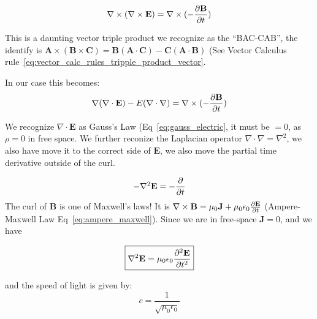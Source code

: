 \begin{equation}
    \nabla\times(\nabla \times \mathbf{E}) = \nabla\times( -\pdv{\mathbf B}{t}) 
\end{equation}

This is a daunting vector triple product we recognize as the  ``BAC-CAB'', the identify is $\mathbf{A}\times(\mathbf{B}\times\mathbf{C})
= \mathbf{B}(\mathbf{A}\cdot\mathbf{C}) - \mathbf{C}(\mathbf{A}\cdot\mathbf{B})$
(See Vector Calculus rule~\eqref{eq:vector_calc_rules_tripple_product_vector}.

In our case this becomes:
\begin{equation}
    \nabla(\nabla\cdot \mathbf E) - E(\nabla \cdot \nabla) = \nabla\times( -\pdv{\mathbf B}{t}) 
\end{equation}

We recognize $\nabla\cdot \mathbf E$ as Gauss's Law (Eq~\ref{eq:gauss_electric}, it must be $=0$, as $\rho=0$ in free space. We  further reconize the Laplacian operator $\nabla \cdot \nabla = \nabla^2$, we also have move it to the correct side of $\mathbf E$, we also move the partial time derivative outside of the curl. 

\begin{equation}
    -\nabla^2 \mathbf{E} = -\pdv{}{t}(\nabla \times \mathbf{B})
\end{equation}
The curl of $\mathbf{B}$ is one of Maxwell's laws! It is $\nabla\times\mathbf B = \mu_0\mathbf J
+ \mu_0\epsilon_0\pdv{\mathbf E}{t}$ (Ampere-Maxwell Law Eq~\ref{eq:ampere_maxwell}). Since we are in free-space $\mathbf J=0$, and we have 

\begin{equation}
    \boxed{\nabla^2 \mathbf{E} = \mu_0\epsilon_0\pdv[2]{\mathbf E}{t}}
\end{equation}

and the speed of light is given by:
\begin{equation}
    \boxed{c = \frac{1}{\sqrt{\mu_0\epsilon_0}}
    \label{eq:speed_of_light}}
\end{equation}